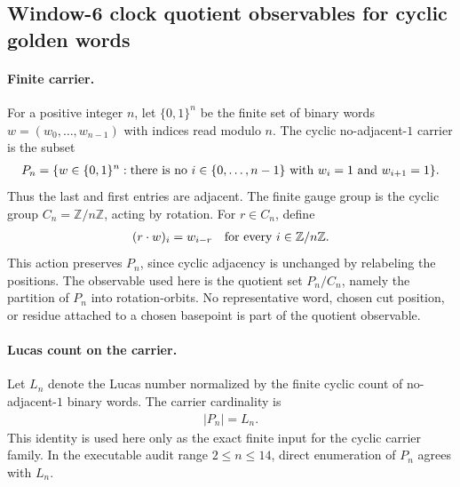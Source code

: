 
\subsection{Window-6 clock quotient observables for cyclic golden words}
\label{sec:window6-clock-gauge-invariant-c10-orbit-observables}

\paragraph{Finite carrier.}
For a positive integer $n$, let $\{0,1\}^n$ be the finite set of binary words $w=(w_0,\ldots,w_{n-1})$ with indices read modulo $n$. The cyclic no-adjacent-$1$ carrier is the subset
$$
\begin{aligned}
P_n=\{w\in \{0,1\}^n: \hbox{there is no }i\in\{0,\ldots,n-1\}\hbox{ with }w_i=1\hbox{ and }w_{i+1}=1\}.
\end{aligned}
$$
Thus the last and first entries are adjacent. The finite gauge group is the cyclic group $C_n=\mathbb Z/n\mathbb Z$, acting by rotation. For $r\in C_n$, define
$$
\begin{aligned}
(r\cdot w)_i=w_{i-r}\quad\hbox{for every }i\in\mathbb Z/n\mathbb Z.
\end{aligned}
$$
This action preserves $P_n$, since cyclic adjacency is unchanged by relabeling the positions. The observable used here is the quotient set $P_n/C_n$, namely the partition of $P_n$ into rotation-orbits. No representative word, chosen cut position, or residue attached to a chosen basepoint is part of the quotient observable.

\paragraph{Lucas count on the carrier.}
Let $L_n$ denote the Lucas number normalized by the finite cyclic count of no-adjacent-$1$ binary words. The carrier cardinality is
$$
\begin{aligned}
|P_n|=L_n.
\end{aligned}
$$
This identity is used here only as the exact finite input for the cyclic carrier family. In the executable audit range $2\leq n\leq 14$, direct enumeration of $P_n$ agrees with $L_n$.

